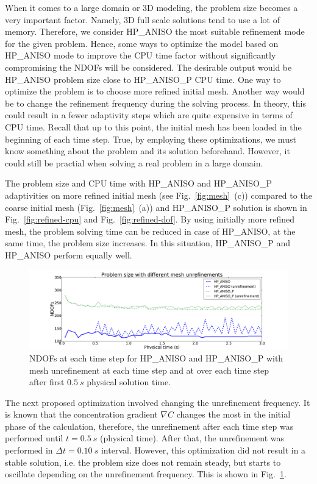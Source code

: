 When it comes to a large domain or 3D modeling, the problem
size becomes a very important factor. Namely, 3D full scale solutions tend to use
a lot of memory. Therefore, we consider HP\_ANISO the most
suitable refinement mode for the given problem. 
Hence, some ways to optimize the model based on HP\_ANISO
mode to improve the CPU time
factor without significantly compromising the NDOFs will be considered. 
The desirable output would be HP\_ANISO problem size
close to HP\_ANISO\_P CPU time. One way to optimize the problem
is to choose more refined initial mesh. Another way would be to change
the refinement frequency during the solving process. In theory, this
could result in a fewer adaptivity steps which are quite expensive in terms
of CPU time. Recall that up to this point,
the initial mesh has been loaded in the beginning of each time step. 
True, by employing these optimizations, we must know something about the problem
and its solution beforehand. However, it could still be practial when solving a real problem
in a large domain.

The problem size and CPU time with HP\_ANISO
and HP\_ANISO\_P adaptivities on more refined initial mesh (see Fig.~\ref{fig:mesh}~(c))
compared to the coarse initial mesh (Fig.~\ref{fig:mesh}~(a)) and 
HP\_ANISO\_P solution is shown in Fig.~\ref{fig:refined-cpu} and Fig.~\ref{fig:refined-dof}.
By using initially more refined mesh, the problem solving time
can be reduced in case of HP\_ANISO, at the same time, the problem size increases.
In this situation, HP\_ANISO\_P and HP\_ANISO perform equally well.

\begin{figure}[!ht]
  \begin{centering}
  \includegraphics[width=\columnwidth]{unreffreq_dof}
  \caption{\label{fig:unreffreq-dof} NDOFs at each time step for
  HP\_ANISO and HP\_ANISO\_P with mesh unrefinement at each time step and at over each
  	time step after first $0.5\ s$ physical solution time.}
  \end{centering}
\end{figure}
The next proposed optimization involved changing the unrefinement frequency.
It is known that the concentration gradient $\nabla C$ changes the most in the initial phase
of the calculation, therefore, the unrefinement after each time step was performed
until $t=0.5\ s$ (physical time). After that, the
unrefinement was performed in $\Delta t = 0.10\ s$ interval.
However, this optimization did not result in a stable solution, i.e. the problem size 
does not remain steady, but starts to oscillate depending on the unrefinement
frequency. This is shown in 
Fig.~\ref{fig:unreffreq-dof}. 

